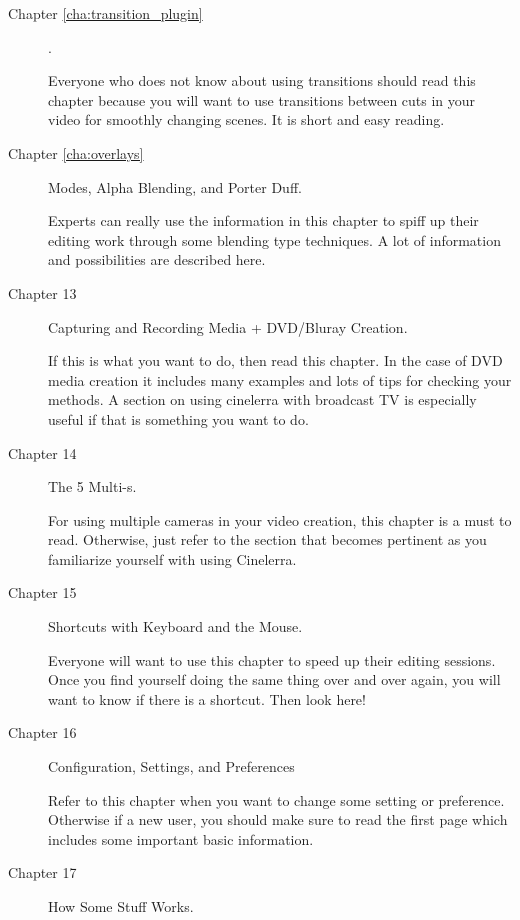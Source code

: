 \begin{description}
    \item[Chapter \ref{cha:transition_plugin}] .

        Everyone who does not know about using transitions should read this chapter because you will want to use transitions between cuts in your video for smoothly changing scenes. 
        It is short and easy reading.

    \item[Chapter \ref{cha:overlays}]  Modes, Alpha Blending, and Porter Duff.

        Experts can really use the information in this chapter to spiff up their editing work through some blending type techniques. 
        A lot of information and possibilities are described here.

    \item[Chapter 13] Capturing and Recording Media + DVD/Bluray Creation.

        If this is what you want to do, then read this chapter. 
        In the case of DVD media creation it includes many examples and lots of tips for checking your methods. 
        A section on using cinelerra with broadcast TV is especially useful if that is something you want to do.

    \item[Chapter 14] The 5 Multi-s.

        For using multiple cameras in your video creation, this chapter is a must to read. Otherwise, just refer
        to the section that becomes pertinent as you familiarize yourself with using Cinelerra.

    \item[Chapter 15] Shortcuts with Keyboard and the Mouse.

        Everyone will want to use this chapter to speed up their editing sessions. 
        Once you find yourself doing the same thing over and over again, you will want to know if there is a shortcut. Then look here!  

    \item[Chapter 16] Configuration, Settings, and Preferences

        Refer to this chapter when you want to change some setting or preference. 
        Otherwise if a new user, you should make sure to read the first page which includes some important basic information.  

    \item[Chapter 17] How Some Stuff Works.


\end{description}
